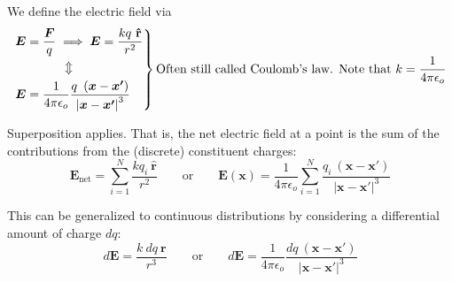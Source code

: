 \documentclass{article}
\numberwithin{equation}{section}
\newcommand{\rhat}{\mathbf{\hat{r}}}
\begin{document}
We define the electric field via
\begin{equation*}
    \begin{rcases} \displaystyle \bm{E} = \frac{\bm{F}}{q} \implies \bm{E} = \frac{kq\ \rhat}{r^2} \\ \displaystyle \qquad\qquad\Updownarrow \\ \displaystyle \bm{E} = \frac{1}{4\pi\epsilon_o} \frac{q\ \left( \bm{x} - \bm{x'} \right)}{\left| \bm{x} - \bm{x'} \right|^3} \end{rcases} \text{Often still called Coulomb's law. Note that } k = \frac{1}{4\pi\epsilon_o}
\end{equation*}

Superposition applies. That is, the net electric field at a point is the sum of the contributions from the (discrete) constituent charges:
\begin{equation*}
    \bm{E}_{\text{net}} = \sum\limits_{i = 1}^N \frac{k q_i\ \rhat}{r^2} \qquad \text{or} \qquad \bm{E}(\bm{x}) = \frac{1}{4\pi\epsilon_o} \sum\limits_{i = 1}^{N} \frac{q_i\ \left( \bm{x} - \bm{x'} \right)}{\left| \bm{x} - \bm{x'} \right|^3}
\end{equation*}

This can be generalized to continuous distributions by considering a differential amount of charge $dq$:
\begin{equation*}
    d\bm{E} = \frac{k\ dq\ \bm{r}}{r^3} \qquad \text{or} \qquad d\bm{E} = \frac{1}{4\pi\epsilon_o} \frac{dq\ \left( \bm{x} - \bm{x'} \right)}{\left| \bm{x} - \bm{x'} \right|^3}
\end{equation*}
\end{document}
